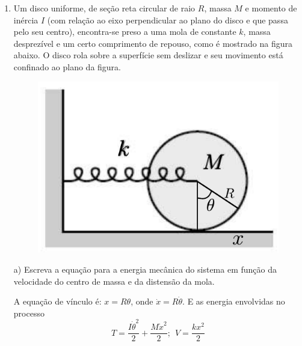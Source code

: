 \begin{enumerate}[start=1,label={\bfseries Q\arabic*.}]
\item Um disco uniforme, de seção reta circular de raio $R$, massa $M$ e momento de inércia $I$ (com relação ao eixo perpendicular ao plano do disco e que passa pelo seu centro), encontra-se preso a uma mola de constante $k$, massa desprezível e um certo comprimento de repouso, como é mostrado na figura abaixo. O disco rola sobre a superfície sem deslizar e seu movimento está confinado ao plano da figura.
\begin{figure}[H]
\centering
\includegraphics[scale=0.7]{classica-img/mola.pdf}
\end{figure}

a) Escreva a equação para a energia mecânica do sistema em função da velocidade do centro de massa e da distensão da mola.

\resposta A equação de vínculo é: $x = R\theta$, onde  $ \dot{x} = R\dot{\theta}$. E as energia envolvidas no processo
$$
T = \frac{I \dot{\theta}^{2}}{2} + \frac{M \dot{x}^{2}}{2}; \ \ V = \frac{k x^{2}}{2}
$$

\end{enumerate}
